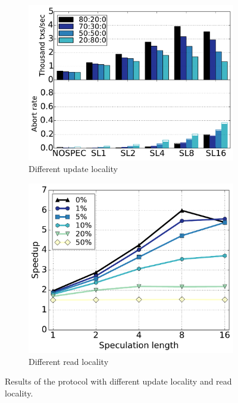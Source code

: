 \begin{figure}[t]
\centering
\begin{subfigure}[t!]{0.494\linewidth}
\def\svgwidth{0.95\columnwidth}
\hspace{-3mm}
\centering \includegraphics[scale = 0.21]{figures/Numberofupdatedserverslocality}
\caption{\footnotesize Different update locality}
\label{fig:remote:a}
\end{subfigure}
\begin{subfigure}[t!]{0.494\linewidth}
\vspace{1mm}
\def\svgwidth{0.95\columnwidth}
\centering \includegraphics[scale = 0.212]{figures/Remotereadremoteread}%
\vspace{-1mm}
\caption{\footnotesize Different read locality}
\label{fig:remote:b}
\end{subfigure}
\caption{Results of the protocol with different update locality and read locality.}
\label{fig:micro_conflict}
\end{figure}

